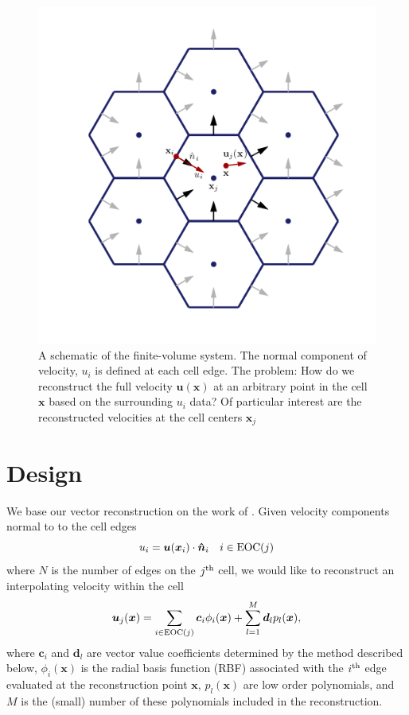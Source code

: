 \documentclass[onecolumn, referee]{svjour3}                     %
\begin{document}
\begin{figure}[ht!]
   \centerline{\includegraphics[width=12.0cm]{./figures/cgrid2.pdf}}
   \caption{A schematic of the finite-volume system. The normal component of velocity, $u_i$ is defined at each cell edge. The problem: How do we reconstruct the full velocity $\bm{u}(\bm{x})$ at an arbitrary point in the cell $\bm{x}$ based on the surrounding $u_i$ data?  Of particular interest are the reconstructed velocities at the cell centers $\bm{x}_j$}
   \label{Cgrid}
\end{figure} 

\section{Design}

We base our vector reconstruction on the work of \cite{Ba}.  Given velocity components normal to to the cell edges
\begin{equation}\label{given_data}
u_i = \bm{u}(\bm{x}_i) \cdot  \bm{\hat{n}}_i \quad  i \in {\rm EOC}(j)
\end{equation}
where $N$ is the number of edges on the $j^{\rm th}$ cell, we would like to reconstruct an interpolating velocity within the cell
\begin{equation}\label{problem}
\bm{u}_j(\bm{x}) = \sum_{i \in {\rm EOC}(j)} \bm{c}_i \phi_i(\bm{x}) + \sum_{l=1}^M \bm{d}_l p_l(\bm{x}),
\end{equation}
where $\bm{c}_i$ and $\bm{d}_l$ are vector value coefficients determined by the method described below, $\phi_i(\bm{x})$ is the radial basis function (RBF) associated with the $i^{\rm th}$ edge evaluated at the reconstruction point $\bm{x}$, $p_l(\bm{x})$ are low order polynomials, and $M$ is the (small) number of these polynomials included in the reconstruction.
\end{document}
